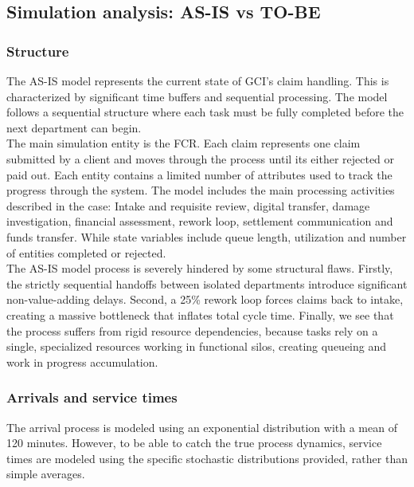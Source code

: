 \subsection{Simulation analysis: AS-IS vs TO-BE}

\subsubsection{Structure}

The AS-IS model represents the current state of GCI's claim handling. This is characterized by significant time buffers and sequential processing. The model follows a sequential structure where each task must be fully completed before the next department can begin. \\

The main simulation entity is the FCR. Each claim represents one claim submitted by a client and moves through the process until its either rejected or paid out. Each entity contains a limited number of attributes used to track the progress through the system. The model includes the main processing activities described in the case: Intake and requisite review, digital transfer, damage investigation, financial assessment, rework loop, settlement communication and funds transfer. While state variables include queue length, utilization and number of entities completed or rejected. \\

The AS-IS model process is severely hindered by some structural flaws. Firstly, the strictly sequential handoffs between isolated departments introduce significant non-value-adding delays. Second, a 25\% rework loop forces claims back to intake, creating a massive bottleneck that inflates total cycle time. Finally, we see that the process suffers from rigid resource dependencies, because tasks rely on a single, specialized resources working in functional silos, creating queueing and work in progress accumulation.  

\subsubsection{Arrivals and service times}

The arrival process is modeled using an exponential distribution with a mean of 120 minutes. However, to be able to catch the true process dynamics, service times are modeled using the specific stochastic distributions provided, rather than simple averages. 

